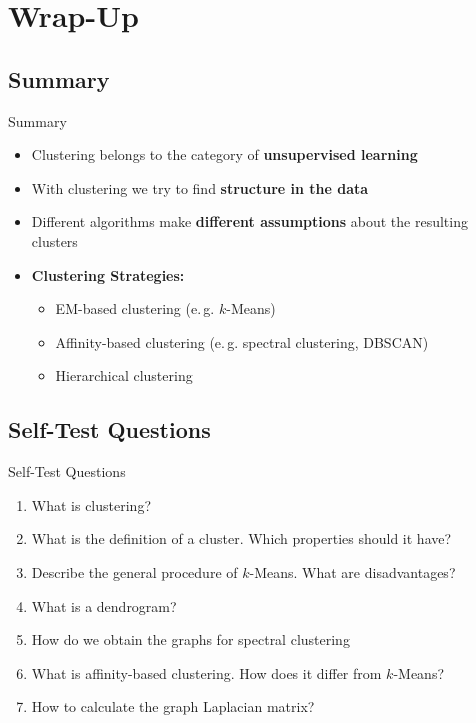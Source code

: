 \section{Wrap-Up}

\subsection{Summary}

\begin{frame}{Summary}{}
	\begin{itemize}
		\item Clustering belongs to the category of \textbf{unsupervised learning}
		\item With clustering we try to find \textbf{structure in the data}
		\item Different algorithms make \textbf{different assumptions} about the resulting clusters
		\item \textbf{Clustering Strategies:}
		\begin{itemize}
			\item EM-based clustering (e.\,g. $k$-Means)
			\item Affinity-based clustering (e.\,g. spectral clustering, DBSCAN)
			\item Hierarchical clustering
		\end{itemize}
	\end{itemize}
\end{frame}


\subsection{Self-Test Questions}

\begin{frame}{Self-Test Questions}{}\important
	\begin{enumerate}
		\item What is clustering?
		\item What is the definition of a cluster. Which properties should it have?
		\item Describe the general procedure of $k$-Means. What are disadvantages?
		\item What is a dendrogram?
		\item How do we obtain the graphs for spectral clustering
		\item What is affinity-based clustering. How does it differ from $k$-Means?
		\item How to calculate the graph Laplacian matrix?
	\end{enumerate}
\end{frame}


